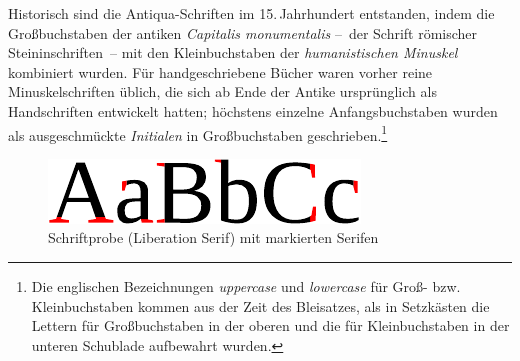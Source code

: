Historisch sind die Antiqua-Schriften im 15.\,Jahrhundert entstanden,
indem die Großbuchstaben der antiken \emph{Capitalis monumentalis}
--~der Schrift römischer Steininschriften~-- mit den Kleinbuchstaben
der \emph{humanistischen Minuskel} kombiniert wurden.  Für
handgeschriebene Bücher waren vorher reine Minuskelschriften üblich,
die sich ab Ende der Antike ursprünglich als Handschriften entwickelt
hatten; höchstens einzelne Anfangsbuchstaben wurden als ausgeschmückte
\emph{Initialen} in Großbuchstaben geschrieben.\footnote{Die
  englischen Bezeichnungen \emph{\foreignlanguage{british}{uppercase}}
  und \emph{\foreignlanguage{british}{lowercase}} für Groß-
  bzw. Kleinbuchstaben kommen aus der Zeit des Bleisatzes, als in
  Setzkästen die Lettern für Großbuchstaben in der oberen und die für
  Kleinbuchstaben in der unteren Schublade aufbewahrt wurden.}

\begin{figure}
  \centering
  \includegraphics[width=.5\textwidth]{Serifen}
  \caption{Schriftprobe (Liberation Serif) mit markierten
    Serifen\protect\footnotemark}
  \label{fig:Serifen}
\end{figure}

